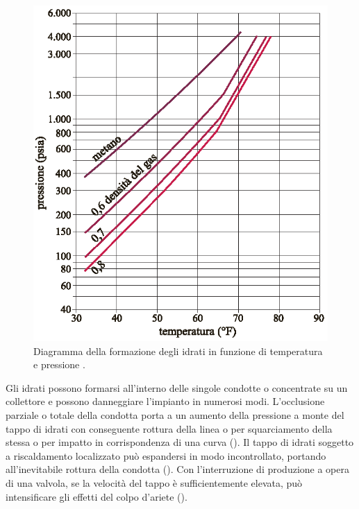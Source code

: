 \begin{figure}[htbp]
    \centering
    \includegraphics[width=.5\textwidth]{fig/impianti/formazioneidrati.eps}
    \caption{Diagramma della formazione degli idrati in funzione di temperatura e pressione \parencite{bianco2005impiantigas}.}
    \label{fig:formazioneidrati}
\end{figure}
Gli idrati possono formarsi all'interno delle singole condotte o concentrate su un collettore e possono danneggiare l'impianto in numerosi modi. L'occlusione parziale o totale della condotta porta a un aumento della pressione a monte del tappo di idrati con conseguente rottura della linea o per squarciamento della stessa o per impatto in corrispondenza di una curva (). Il tappo di idrati soggetto a riscaldamento localizzato può espandersi in modo incontrollato, portando all'inevitabile rottura della condotta (). Con l'interruzione di produzione a opera di una valvola, se la velocità del tappo è sufficientemente elevata, può intensificare gli effetti del colpo d'ariete  ().

